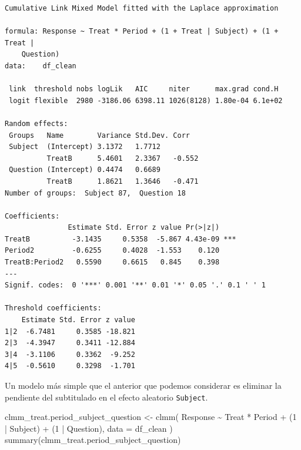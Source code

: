 \documentclass[
  12pt,
  a4paper,
  extrafontsizes,
  onecolumn,
  openright]{memoir}
\newenvironment{Shaded}{\begin{snugshade}}{\end{snugshade}}
\newcommand{\AttributeTok}[1]{\textcolor[rgb]{0.40,0.45,0.13}{#1}}
\newcommand{\DecValTok}[1]{\textcolor[rgb]{0.68,0.00,0.00}{#1}}
\newcommand{\FunctionTok}[1]{\textcolor[rgb]{0.28,0.35,0.67}{#1}}
\newcommand{\NormalTok}[1]{\textcolor[rgb]{0.00,0.23,0.31}{#1}}
\newcommand{\OtherTok}[1]{\textcolor[rgb]{0.00,0.23,0.31}{#1}}
\newcommand{\SpecialCharTok}[1]{\textcolor[rgb]{0.37,0.37,0.37}{#1}}
\begin{document}
\begin{verbatim}
Cumulative Link Mixed Model fitted with the Laplace approximation

formula: Response ~ Treat * Period + (1 + Treat | Subject) + (1 + Treat |  
    Question)
data:    df_clean

 link  threshold nobs logLik   AIC     niter      max.grad cond.H 
 logit flexible  2980 -3186.06 6398.11 1026(8128) 1.80e-04 6.1e+02

Random effects:
 Groups   Name        Variance Std.Dev. Corr   
 Subject  (Intercept) 3.1372   1.7712          
          TreatB      5.4601   2.3367   -0.552 
 Question (Intercept) 0.4474   0.6689          
          TreatB      1.8621   1.3646   -0.471 
Number of groups:  Subject 87,  Question 18 

Coefficients:
               Estimate Std. Error z value Pr(>|z|)    
TreatB          -3.1435     0.5358  -5.867 4.43e-09 ***
Period2         -0.6255     0.4028  -1.553    0.120    
TreatB:Period2   0.5590     0.6615   0.845    0.398    
---
Signif. codes:  0 '***' 0.001 '**' 0.01 '*' 0.05 '.' 0.1 ' ' 1

Threshold coefficients:
    Estimate Std. Error z value
1|2  -6.7481     0.3585 -18.821
2|3  -4.3947     0.3411 -12.884
3|4  -3.1106     0.3362  -9.252
4|5  -0.5610     0.3298  -1.701
\end{verbatim}

\normalsize

Un modelo más simple que el anterior que podemos considerar es eliminar
la pendiente del subtitulado en el efecto aleatorio \texttt{Subject}.

\scriptsize

\begin{Shaded}
\begin{Highlighting}[]
\NormalTok{clmm\_treat.period\_subject\_question }\OtherTok{\textless{}{-}} \FunctionTok{clmm}\NormalTok{(}
\NormalTok{    Response }\SpecialCharTok{\textasciitilde{}}\NormalTok{ Treat }\SpecialCharTok{*}\NormalTok{ Period }\SpecialCharTok{+}\NormalTok{ (}\DecValTok{1} \SpecialCharTok{|}\NormalTok{ Subject) }\SpecialCharTok{+}\NormalTok{ (}\DecValTok{1} \SpecialCharTok{|}\NormalTok{ Question),}
    \AttributeTok{data =}\NormalTok{ df\_clean}
\NormalTok{)}
\FunctionTok{summary}\NormalTok{(clmm\_treat.period\_subject\_question)}
\end{Highlighting}
\end{Shaded}
\end{document}

